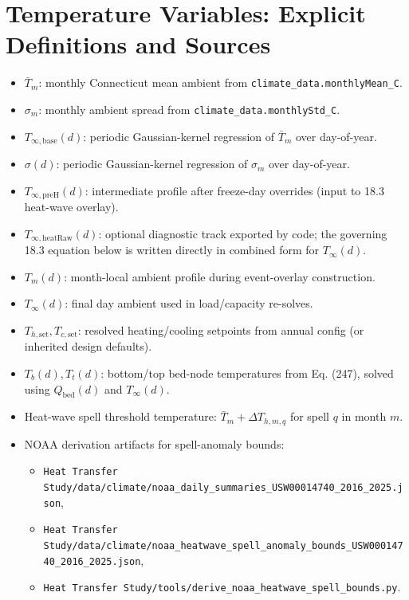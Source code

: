\documentclass[11pt]{article}
\begin{document}
\section{Temperature Variables: Explicit Definitions and Sources}
\begin{itemize}[leftmargin=*]
\item \(\bar T_m\): monthly Connecticut mean ambient from \texttt{climate\_data.monthlyMean\_C}.
\item \(\sigma_m\): monthly ambient spread from \texttt{climate\_data.monthlyStd\_C}.
\item \(T_{\infty,\mathrm{base}}(d)\): periodic Gaussian-kernel regression of \(\bar T_m\) over day-of-year.
\item \(\sigma(d)\): periodic Gaussian-kernel regression of \(\sigma_m\) over day-of-year.
\item \(T_{\infty,\mathrm{preH}}(d)\): intermediate profile after freeze-day overrides (input to 18.3 heat-wave overlay).
\item \(T_{\infty,\mathrm{heatRaw}}(d)\): optional diagnostic track exported by code; the governing 18.3 equation below is written directly in combined form for \(T_\infty(d)\).
\item \(T_m(d)\): month-local ambient profile during event-overlay construction.
\item \(T_\infty(d)\): final day ambient used in load/capacity re-solves.
\item \(T_{h,\mathrm{set}},T_{c,\mathrm{set}}\): resolved heating/cooling setpoints from annual config (or inherited design defaults).
\item \(T_b(d),T_t(d)\): bottom/top bed-node temperatures from Eq. (247), solved using \(Q_{\mathrm{bed}}(d)\) and \(T_\infty(d)\).
\item Heat-wave spell threshold temperature: \(\bar T_m+\Delta T_{h,m,q}\) for spell \(q\) in month \(m\).
\item NOAA derivation artifacts for spell-anomaly bounds:
\begin{itemize}[leftmargin=*]
\item \texttt{Heat Transfer Study/data/climate/noaa\_daily\_summaries\_USW00014740\_2016\_2025.json},
\item \texttt{Heat Transfer Study/data/climate/noaa\_heatwave\_spell\_anomaly\_bounds\_USW00014740\_2016\_2025.json},
\item \texttt{Heat Transfer Study/tools/derive\_noaa\_heatwave\_spell\_bounds.py}.
\end{itemize}
\end{itemize}
\end{document}
